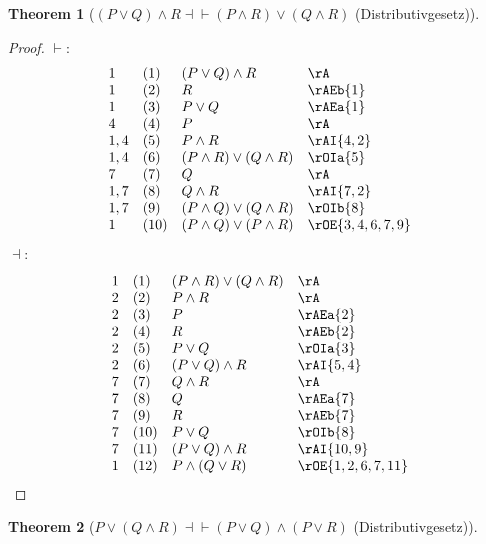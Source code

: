 \documentclass{book}
\theoremstyle{plain}
\newtheorem{theorem}{Theorem}
\theoremstyle{remark}
\theoremstyle{definition}
\begin{document}
\label{LpPOrQRpAndREqvLpPAndRRpOrLpQAndRRp}
\begin{theorem}[\((P\lor Q)\land R \dashv \vdash  (P \land R) \lor (Q\land R)\) (Distributivgesetz)]
\end{theorem}
\begin{proof}
	\(\vdash:\)
	\[
	\begin{array}{llll}
		1 & (1) & (P\lor Q)\land R & \rA \\
		1 & (2) & R & \rAEb{1} \\
		1 & (3) & P\lor Q & \rAEa{1} \\
		4 & (4) & P & \rA \\
		1,4 & (5) & P \land R & \rAI{4,2} \\
		1,4 & (6) & (P \land R) \lor (Q\land R) & \rOIa{5} \\
		7 & (7) & Q & \rA \\
		1,7 & (8) & Q \land R & \rAI{7,2} \\
		1,7 & (9) & (P \land Q) \lor (Q\land R) & \rOIb{8} \\
		1 & (10) & (P \land Q) \lor (P\land R) & \rOE{3,4,6,7,9} \\
	\end{array}
	\]
	
	\(\dashv:\)
	
	\[
	\begin{array}{llll}
		1 & (1) & (P \land R) \lor (Q\land R) & \rA \\
		2 & (2) & P \land R & \rA \\
		2 & (3) & P & \rAEa{2} \\
		2 & (4) & R & \rAEb{2} \\
		2 & (5) & P \lor Q & \rOIa{3} \\
		2 & (6) & (P \lor Q)\land R & \rAI{5,4} \\
		7 & (7) & Q \land R & \rA \\
		7 & (8) & Q & \rAEa{7} \\
		7 & (9) & R & \rAEb{7} \\
		7 & (10) & P \lor Q & \rOIb{8} \\
		7 & (11) & (P \lor Q)\land R & \rAI{10,9} \\
		1 & (12) & P \land (Q \lor R) & \rOE{1,2,6,7,11} 
	\end{array}
	\]
\end{proof}

\label{POrLpQAndRRpEqvLpPOrQRpAndLpPOrRRp}
\begin{theorem}[\(P \lor (Q\land R) \dashv \vdash  (P \lor Q) \land (P\lor R)\) (Distributivgesetz)]
\end{theorem}
\end{document}
